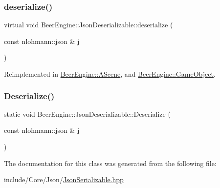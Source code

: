 \subsubsection{\texorpdfstring{deserialize()}{deserialize()}}
{\footnotesize\ttfamily virtual void Beer\+Engine\+::\+Json\+Deserializable\+::deserialize (\begin{DoxyParamCaption}\item[{const nlohmann\+::json \&}]{j }\end{DoxyParamCaption})\hspace{0.3cm}{\ttfamily [virtual]}}



Reimplemented in \mbox{\hyperlink{class_beer_engine_1_1_a_scene_a3db491adb7ff57a3a527024fd0a6001f}{Beer\+Engine\+::\+A\+Scene}}, and \mbox{\hyperlink{class_beer_engine_1_1_game_object_a68a7f2c23d06d575e683705195821c87}{Beer\+Engine\+::\+Game\+Object}}.

\mbox{\label{class_beer_engine_1_1_json_deserializable_af4c5582f75eb96988c5d4ff546218e1e}} 
\subsubsection{\texorpdfstring{Deserialize()}{Deserialize()}}
{\footnotesize\ttfamily static void Beer\+Engine\+::\+Json\+Deserializable\+::\+Deserialize (\begin{DoxyParamCaption}\item[{const nlohmann\+::json \&}]{j }\end{DoxyParamCaption})\hspace{0.3cm}{\ttfamily [static]}}



The documentation for this class was generated from the following file\+:\begin{DoxyCompactItemize}
\item 
include/\+Core/\+Json/\mbox{\hyperlink{_json_serializable_8hpp}{Json\+Serializable.\+hpp}}\end{DoxyCompactItemize}
